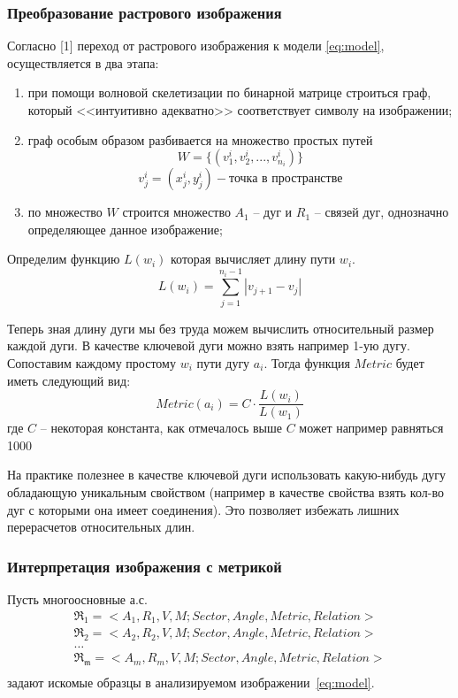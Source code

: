 \subsubsection{Преобразование растрового изображения}
Согласно [1] переход от растрового изображения к модели \ref{eq:model}, осуществляется в два этапа:
\begin{enumerate}
\item при помощи волновой скелетизации по бинарной матрице строиться граф, который <<интуитивно адекватно>> соответствует символу на изображении;
\item граф особым образом разбивается на множество простых путей 
$$W = \{ (v_{1}^i, v_{2}^i, ..., v_{n_i}^i) \}$$
$$v_{j}^i = (x_j^i, y_j^i) - \text{точка в пространстве} $$
\item по множество $W$ строится множество $A_1$ -- дуг и $R_1$ -- связей дуг, однозначно определяющее данное изображение;
\end{enumerate}

Определим функцию $L(w_i)$ которая вычисляет длину пути $w_i$.
$$L(w_i) = \sum\limits_{j=1}^{n_i-1}|v_{j+1}-v_j|$$

Теперь зная длину дуги мы без труда можем вычислить относительный размер каждой дуги. В качестве ключевой дуги можно взять например 1-ую дугу. Сопоставим каждому простому $w_i$ пути дугу $a_i$. Тогда функция $Metric$ будет иметь следующий вид:
$$Metric(a_i) = C\cdot\frac{L(w_i)}{L(w_1)}$$
где $C$ -- некоторая константа, как отмечалось выше $C$ может например равняться 1000

\begin{remark}
На практике полезнее в качестве ключевой дуги использовать какую-нибудь дугу обладающую уникальным свойством (например в качестве свойства взять кол-во дуг с которыми она имеет соединения). Это позволяет избежать лишних перерасчетов относительных длин. 
\end{remark}

\subsubsection{Интерпретация изображения с метрикой}
\noindent
Пусть многоосновные а.с.
\begin{equation}
	\begin{array}{c}
	\mathfrak{R_1}=<A_1, R_1, V, M; Sector, Angle, Metric, Relation> \\
	\mathfrak{R_2}=<A_2, R_2, V, M; Sector, Angle, Metric, Relation> \\
	\dots\\
	\mathfrak{R_m}=<A_m, R_m, V, M; Sector, Angle, Metric, Relation> \\
	\end{array}
	\label{templates_with_metrics}
\end{equation}
задают искомые образцы в анализируемом изображении~\ref{eq:model}.

